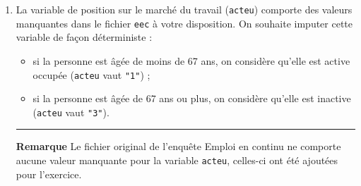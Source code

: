 \documentclass[12pt,twosided, notitlepage]{book}
\newenvironment{Shaded}{}{}
\newcommand{\KeywordTok}[1]{\textcolor[rgb]{0.00,0.00,1.00}{{#1}}}
\newcommand{\DataTypeTok}[1]{{#1}}
\newcommand{\DecValTok}[1]{{#1}}
\newcommand{\StringTok}[1]{\textcolor[rgb]{0.00,0.50,0.50}{{#1}}}
\newcommand{\CommentTok}[1]{\textcolor[rgb]{0.00,0.50,0.00}{{#1}}}
\newcommand{\NormalTok}[1]{{#1}}
\providecommand{\tightlist}{%
  \setlength{\itemsep}{0pt}\setlength{\parskip}{0pt}}
\renewenvironment{Shaded}{\begin{snugshade}}{\end{snugshade}}
\begin{document}
\begin{enumerate}
\begin{enumerate}
\begin{Shaded}
\end{Shaded}

    \begin{center} \rule{0.5\linewidth}{\linethickness}\end{center}

    \bigskip  \fi 
  \end{enumerate}
\item
  La variable de position sur le marché du travail (\texttt{acteu})
  comporte des valeurs manquantes dans le fichier \texttt{eec} à votre
  disposition. On souhaite imputer cette variable de façon déterministe
  :

  \begin{itemize}
  \tightlist
  \item
    si la personne est âgée de moins de 67 ans, on considère qu'elle est
    active occupée (\texttt{acteu} vaut \texttt{"1"}) ;
  \item
    si la personne est âgée de 67 ans ou plus, on considère qu'elle est
    inactive (\texttt{acteu} vaut \texttt{"3"}).
  \end{itemize}

  \begin{center}\rule{0.5\linewidth}{\linethickness}\end{center}

  \textbf{Remarque} Le fichier original de l'enquête Emploi en continu
  ne comporte aucune valeur manquante pour la variable \texttt{acteu},
  celles-ci ont été ajoutées pour l'exercice.


\end{enumerate}
\end{document}

